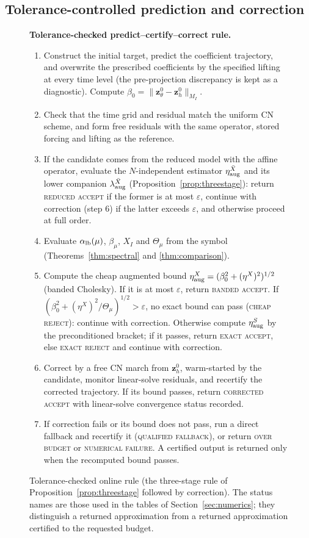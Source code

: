 \documentclass[11pt]{amsart}
\theoremstyle{remark}
\newcommand{\zz}{\mathbf z}
\newcommand{\Thmu}{\Theta_\mu}
\begin{document}
\subsection{Tolerance-controlled prediction and correction}
\label{ssec:algorithm}\label{ssec:two-stage}\label{ssec:correction}
\begin{figure}[!htbp]
\centering
\begin{minipage}{0.96\linewidth}
\textbf{Tolerance-checked predict--certify--correct rule.}
\begin{enumerate}[leftmargin=2em]
\item Construct the initial target, predict the coefficient trajectory, and
overwrite the prescribed coefficients by the specified lifting at every time
level (the pre-projection discrepancy is kept as a diagnostic). Compute
$\beta_0=\|\zz_\theta^0-\zz_h^0\|_{M_I}$.
\item Check that the time grid and residual match the uniform CN scheme, and form free residuals with the same operator, stored forcing
and lifting as the reference.
\item If the candidate comes from the reduced model with the affine operator, evaluate the
$N$-independent estimator $\eta^{\bar X}_{\rm aug}$ and its lower companion $\lambda^{\bar X}_{\rm aug}$
(Proposition~\ref{prop:threestage}): return \textsc{reduced accept} if the former is at most
$\varepsilon$, continue with correction (step 6) if the latter exceeds $\varepsilon$, and otherwise
proceed at full order.
\item Evaluate $\alpha_{\rm lb}(\mu)$, $\beta_\mu$, $X_I$ and $\Thmu$ from the symbol
(Theorems~\ref{thm:spectral} and \ref{thm:comparison}).
\item Compute the cheap augmented bound $\eta^X_{\rm aug}=(\beta_0^2+(\eta^X)^2)^{1/2}$
(banded Cholesky).  If it is at most $\varepsilon$, return \textsc{banded accept}.  If
$(\beta_0^2+(\eta^X)^2/\Thmu)^{1/2}>\varepsilon$, no exact bound can pass (\textsc{cheap reject}): continue with correction.
Otherwise compute $\eta^S_{\rm aug}$ by the preconditioned bracket; if it passes, return
\textsc{exact accept}, else \textsc{exact reject} and continue with correction.
\item Correct by a free CN march from $\zz_h^0$, warm-started by the
candidate, monitor linear-solve residuals, and recertify the
corrected trajectory. If its bound passes, return \textsc{corrected accept}
with linear-solve convergence status recorded.
\item If correction fails or its bound does not pass, run a direct
fallback and recertify it (\textsc{qualified fallback}), or return
\textsc{over budget} or \textsc{numerical failure}. A certified output is returned only when the recomputed bound passes.
\end{enumerate}
\end{minipage}
\caption{Tolerance-checked online rule (the three-stage rule of Proposition~\ref{prop:threestage}
followed by correction). The status names are those used in the tables of Section~\ref{sec:numerics};
they distinguish a returned approximation from a returned approximation certified to the requested budget.}
\label{alg:pcc}
\end{figure}
\end{document}

